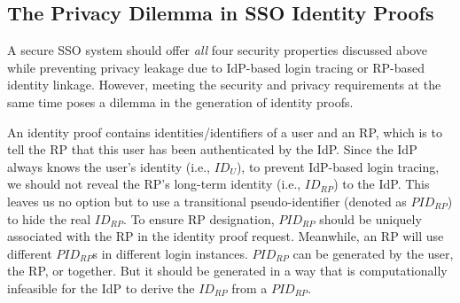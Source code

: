 \subsection{The Privacy Dilemma in SSO Identity Proofs}
\label{subsec:challenges}

A secure SSO system should offer {\em all} four security properties discussed above while preventing privacy leakage due to IdP-based login tracing or RP-based identity linkage. However, meeting the security and privacy requirements at the same time poses a dilemma in the generation of identity proofs.

An identity proof contains identities/identifiers of a user and an RP, which is to tell the RP that this user has been authenticated by the IdP.
Since the IdP always knows the user's identity (i.e., $ID_U$), to prevent IdP-based login tracing, we should not reveal the RP's long-term identity (i.e., $ID_{RP}$) to the IdP. This leaves us no option but to use a transitional pseudo-identifier (denoted as $PID_{RP}$) to hide the real $ID_{RP}$. To ensure RP designation, $PID_{RP}$ should be uniquely associated with the RP in the identity proof request. Meanwhile, an RP will use different $PID_{RP}$s in different login instances. $PID_{RP}$ can be generated by the user, the RP, or together. But it should be generated in a way that is computationally infeasible for the IdP to derive the $ID_{RP}$ from a $PID_{RP}$.

